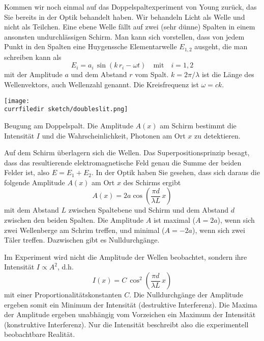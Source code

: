 Kommen wir noch einmal auf das Doppelspaltexperiment von Young zurück, das Sie bereits in der Optik behandelt haben. Wir behandeln Licht als Welle und nicht als Teilchen. Eine ebene Welle fällt auf zwei (sehr dünne) Spalten in einem ansonsten undurchlässigen Schirm. Man kann sich vorstellen, dass von jedem Punkt in den Spalten eine Huygenssche Elementarwelle $E_{1,2}$ ausgeht, die man schreiben kann als 
\begin{equation}
    E_{i} = a_i \, \sin ( k \, r_i - \omega t) \quad \text{mit} \quad i = 1,2
\end{equation}
mit der Amplitude $a$ und dem Abstand $r$ vom Spalt. $k = 2 \pi / \lambda $ ist die Länge des Wellenvektors, auch Wellenzahl genannt.
Die Kreisfrequenz ist $\omega = c k$.


\begin{marginfigure}
    \texttt{[image: \\currfiledir sketch/doubleslit.png]}
    \caption{Beugung am Doppelspalt. Die Amplitude $A(x)$ am Schirm bestimmt die Intensität $I$ und die Wahrscheinlichkeit, Photonen am Ort $x$ zu detektieren.}
\end{marginfigure}


Auf dem Schirm überlagern sich die Wellen. Das Superpositionsprinzip besagt, dass das resultierende elektromagnetische Feld genau die Summe der beiden Felder ist, also $E = E_1 + E_2$. In der Optik haben Sie gesehen, dass sich daraus die folgende Amplitude $A(x)$ am Ort $x$ des Schirms ergibt
\begin{equation}
    A(x) = 2 a\cos \left( \frac{\pi d}{\lambda L} \, x \right)
\end{equation}
mit dem Abstand $L$ zwischen Spaltebene und Schirm und dem Abstand $d$ zwischen den beiden Spalten. Die Amplitude $A$ ist maximal ($A = 2a$), wenn sich zwei Wellenberge am Schrim treffen, und minimal ($A = -2 a$), wenn sich zwei Täler treffen.  Dazwischen gibt es Nulldurchgänge. 

Im Experiment wird nicht die Amplitude der Wellen beobachtet, sondern ihre Intensität $I \propto A^2$, d.h.
\begin{equation}
    I(x) = C \, \cos^2 \left( \frac{\pi d}{\lambda L} \, x \right)
\end{equation}
mit einer Proportionalitätskonstanten $C$. Die Nulldurchgänge der Amplitude ergeben somit ein Minimum der Intensität (destruktive Interferenz). Die Maxima der Amplitude ergeben unabhängig vom Vorzeichen ein Maximum der Intensität (konstruktive Interferenz). Nur die Intensität beschreibt also die experimentell beobachtbare Realität.


